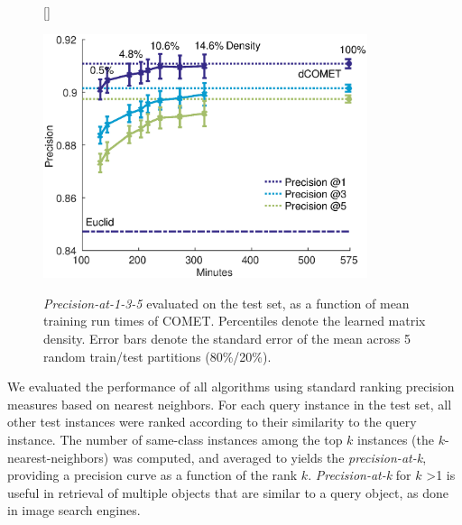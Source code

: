 \documentclass[twoside,11pt]{article}
\newcommand\mat[1]{{#1}}
\newcommand{\Vk}{\mat{V_k}}
\newcommand{\Vgrc}{\{\Vk\}_{k=1}^{d}} %
\begin{document}
\begin{figure}[t]
   \captionsetup{font=small}
   [\FBwidth]
   {\caption{\textit{Precision-at-1-3-5} evaluated on the test set, as a function of mean training run times of COMET. Percentiles denote the learned matrix density. Error bars denote the standard error of the mean across 5 random train/test partitions (80\%/20\%).}\label{spCometPrecTime}}
   {\includegraphics[width=9.5cm]{sCOMET_precision_vs_runtime}}
   \vskip -10pt
\end{figure}

We evaluated the performance of all algorithms using standard ranking precision measures based on nearest neighbors. For each query instance in the test set, all other test instances were ranked according to their similarity to the query instance. The number of same-class instances among the top $k$ instances (the $k$-nearest-neighbors) was computed, and averaged to  yields the \textit{precision-at-k}, providing a precision curve as a function of the rank $k$. \textit{Precision-at-k} for $k$ >1 is useful in retrieval of multiple objects that are similar to a query object, as done in image search engines.
\end{document}
